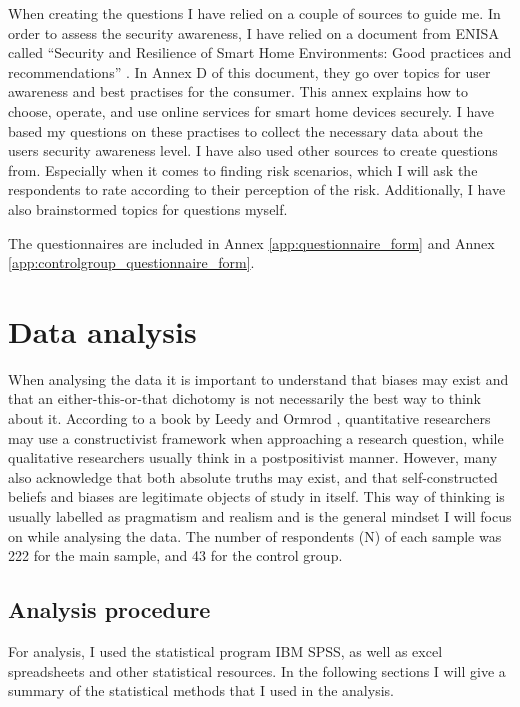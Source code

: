 When creating the questions I have relied on a couple of sources to guide me. In order to assess the security awareness, I have relied on a document from ENISA called ``Security and Resilience of Smart Home Environments: Good practices and recommendations'' \cite{ENISA2015SmartHome}. In Annex D of this document, they go over topics for user awareness and best practises for the consumer. This annex explains how to choose, operate, and use online services for smart home devices securely. I have based my questions on these practises to collect the necessary data about the users security awareness level. I have also used other sources \cite{Awad2018} \cite{Caviglione2015} \cite{Schaik2017} to create questions from. Especially when it comes to finding risk scenarios, which I will ask the respondents to rate according to their perception of the risk. Additionally, I have also brainstormed topics for questions myself. 

The questionnaires are included in Annex \ref{app:questionnaire_form} and Annex \ref{app:controlgroup_questionnaire_form}. 

\section{Data analysis}
When analysing the data it is important to understand that biases may exist and that an either-this-or-that dichotomy is not necessarily the best way to think about it. According to a book by Leedy and Ormrod \cite{pracres}, quantitative researchers may use a constructivist framework when approaching a research question, while qualitative researchers usually think in a postpositivist manner. However, many also acknowledge that both absolute truths may exist, and that self-constructed beliefs and biases are legitimate objects of study in itself. This way of thinking is usually labelled as pragmatism and realism and is the general mindset I will focus on while analysing the data. The number of respondents (N) of each sample was 222 for the main sample, and 43 for the control group. 

\subsection{Analysis procedure}
For analysis, I used the statistical program IBM SPSS, as well as excel spreadsheets and other statistical resources. In the following sections I will give a summary of the statistical methods that I used in the analysis. 


